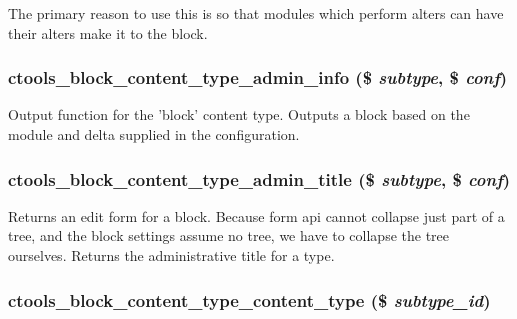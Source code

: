 The primary reason to use this is so that modules which perform alters can have their alters make it to the block. \hypertarget{block_8inc_a1171315f05fb634e86d24b39da3dfa8f}{
\subsubsection[{ctools\_\-block\_\-content\_\-type\_\-admin\_\-info}]{\setlength{\rightskip}{0pt plus 5cm}ctools\_\-block\_\-content\_\-type\_\-admin\_\-info (\$ {\em subtype}, \/  \$ {\em conf})}}
\label{block_8inc_a1171315f05fb634e86d24b39da3dfa8f}
Output function for the 'block' content type. Outputs a block based on the module and delta supplied in the configuration. \hypertarget{block_8inc_a29fbadd37d2baf2e9481c9b641d90a1b}{
\subsubsection[{ctools\_\-block\_\-content\_\-type\_\-admin\_\-title}]{\setlength{\rightskip}{0pt plus 5cm}ctools\_\-block\_\-content\_\-type\_\-admin\_\-title (\$ {\em subtype}, \/  \$ {\em conf})}}
\label{block_8inc_a29fbadd37d2baf2e9481c9b641d90a1b}
Returns an edit form for a block. Because form api cannot collapse just part of a tree, and the block settings assume no tree, we have to collapse the tree ourselves. Returns the administrative title for a type. \hypertarget{block_8inc_a4c1c8dd8b4c59a7efa78259046cda6b4}{
\subsubsection[{ctools\_\-block\_\-content\_\-type\_\-content\_\-type}]{\setlength{\rightskip}{0pt plus 5cm}ctools\_\-block\_\-content\_\-type\_\-content\_\-type (\$ {\em subtype\_\-id})}}
